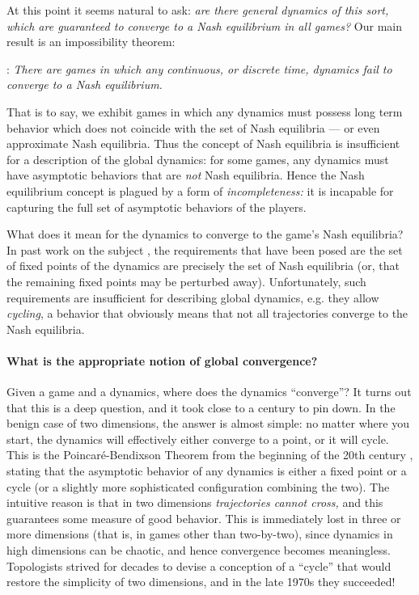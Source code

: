 \documentclass[11pt]{article}
\begin{document}
At this point it seems natural to ask:  {\em are there general dynamics of this sort, which are guaranteed to converge to a Nash equilibrium in all games?}  Our main result is an impossibility theorem:

\medskip{}: {\em There are games in which any continuous, or discrete time, dynamics fail to converge to a Nash equilibrium.}

\smallskip\noindent
That is to say, we exhibit games in which any dynamics must possess long term behavior which does not coincide with the set of Nash equilibria --- or even approximate Nash equilibria.  Thus the concept of Nash equilibria is
insufficient for a description of the global dynamics: for some games, any dynamics  must have asymptotic behaviors that are {\em not} Nash equilibria.  Hence  the Nash equilibrium concept is plagued by a form of {\em incompleteness:} it is incapable for capturing the full set of asymptotic behaviors of the players.

What does it mean for the dynamics to converge to the game's Nash equilibria?
In past work on the subject \citep{DemichelisRitzberger, DeMichelisGermano1}, the requirements that have been posed are the set of fixed points of the dynamics are precisely the set of Nash equilibria (or, that the remaining fixed points may be perturbed away).  Unfortunately, such requirements are insufficient for describing global dynamics, e.g. they allow {\em cycling}, a behavior that obviously means that not all trajectories converge to the Nash equilibria.

\paragraph{What is the appropriate notion of global convergence?}
Given a game and a dynamics, where does the dynamics ``converge''?
It turns out that this is a deep question, and it took close to a century to pin down.
In the benign case of two dimensions, the answer is almost simple:  no matter where you start, the dynamics will effectively either converge to a point, or it will cycle.  This is the Poincar\'e-Bendixson Theorem from the beginning of the 20th century \citep{SmaleChaosBook}, stating that the asymptotic behavior of any dynamics is either a fixed point or a cycle (or a slightly more sophisticated configuration combining the two).  The intuitive reason is that in two dimensions {\em trajectories cannot cross,} and this guarantees some measure of good behavior.  This is immediately lost in three or more dimensions (that is, in games other than two-by-two), since dynamics in high dimensions can be chaotic, and hence convergence becomes meaningless. Topologists strived for decades to devise a conception of a ``cycle'' that would restore the simplicity of two dimensions, and in the late 1970s they succeeded!
\end{document}
